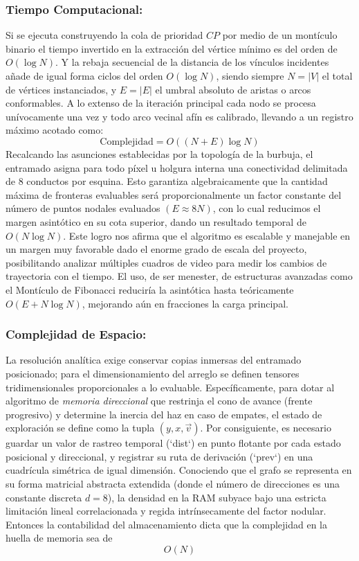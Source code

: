 \subsubsection{Tiempo Computacional:}
Si se ejecuta construyendo la cola de prioridad $CP$ por medio de un montículo binario el tiempo invertido en la extracción del vértice mínimo es del orden de $O(\log N)$. Y la rebaja secuencial de la distancia de los vínculos incidentes añade de igual forma ciclos del orden $O(\log N)$, siendo siempre $N = |V|$ el total de vértices instanciados, y $E = |E|$ el umbral absoluto de aristas o arcos conformables.
A lo extenso de la iteración principal cada nodo se procesa unívocamente una vez y todo arco vecinal afín es calibrado, llevando a un registro máximo acotado como:
\[\text{Complejidad} = O((N + E) \log N) \]
Recalcando las asunciones establecidas por la topología de la burbuja, el entramado asigna para todo píxel u holgura interna una conectividad delimitada de $8$ conductos por esquina. Esto garantiza algebraicamente que la cantidad máxima de fronteras evaluables será proporcionalmente un factor constante del número de puntos nodales evaluados $(E \approx 8N)$, con lo cual reducimos el margen asintótico en su cota superior, dando un resultado temporal de $O(N \log N)$. Este logro nos afirma que el algoritmo es escalable y manejable en un margen muy favorable dado el enorme grado de escala del proyecto, posibilitando analizar múltiples cuadros de video para medir los cambios de trayectoria con el tiempo. El uso, de ser menester, de estructuras avanzadas como el Montículo de Fibonacci reduciría la asintótica hasta teóricamente $O(E + N \log N)$, mejorando aún en fracciones la carga principal.

\subsubsection{Complejidad de Espacio:}
La resolución analítica exige conservar copias inmersas del entramado posicionado; para el dimensionamiento del arreglo se definen tensores tridimensionales proporcionales a lo evaluable. Específicamente, para dotar al algoritmo de \textit{memoria direccional} que restrinja el cono de avance (frente progresivo) y determine la inercia del haz en caso de empates, el estado de exploración se define como la tupla $(y, x, \vec{v})$. Por consiguiente, es necesario guardar un valor de rastreo temporal (`dist`) en punto flotante por cada estado posicional y direccional, y registrar su ruta de derivación (`prev`) en una cuadrícula simétrica de igual dimensión. Conociendo que el grafo se representa en su forma matricial abstracta extendida (donde el número de direcciones es una constante discreta $d=8$), la densidad en la RAM subyace bajo una estricta limitación lineal correlacionada y regida intrínsecamente del factor nodular. Entonces la contabilidad del almacenamiento dicta que la complejidad en la huella de memoria sea de
\[ O(N) \]


